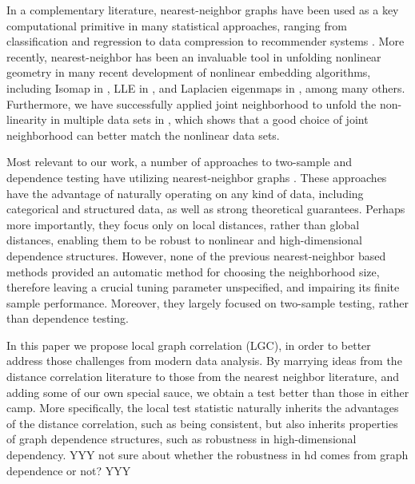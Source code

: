 \documentclass[11pt]{article}
\begin{document}
In a complementary literature, nearest-neighbor graphs have been used as a key computational primitive in many statistical approaches, ranging from classification and regression \cite{Stone1977} to data compression to recommender systems \cite{Sarwar2000}. 
More recently, nearest-neighbor has been an invaluable tool in unfolding nonlinear geometry in many recent development of nonlinear embedding algorithms, including Isomap in \cite{TenenbaumSilvaLangford2000, SilvaTenenbaum2003}, LLE in \cite{SaulRoweis2000, RoweisSaul2003}, and Laplacien eigenmaps in \cite{BelkinNiyogi2003}, among many others. Furthermore, we have successfully applied joint neighborhood to unfold the non-linearity in multiple data sets in \cite{ShenVogelsteinPriebe2015}, which shows that a good choice of joint neighborhood can better match the nonlinear data sets. 



Most relevant to our work, a number of approaches to two-sample and dependence testing have utilizing nearest-neighbor graphs \cite{David1966,Friedman1983,Schilling1986,Dumcke2014}.  These approaches have the advantage of naturally operating on any kind of data, including categorical and structured data, as well as strong theoretical guarantees.  Perhaps more importantly, they focus only on local distances, rather than global distances, enabling them to be robust to nonlinear and high-dimensional dependence structures.  However, none of the previous nearest-neighbor based methods provided an automatic method for choosing the neighborhood size, therefore leaving a crucial tuning parameter unspecified, and impairing its finite sample performance. Moreover, they largely focused on two-sample testing, rather than dependence testing.  




In this paper we propose local graph correlation (LGC), in order to better address those challenges from modern data analysis. By marrying ideas from the distance correlation literature to those from the nearest neighbor literature, and adding some of our own special sauce, we obtain a test better than those in either camp.  More specifically,  the local test statistic naturally inherits the advantages of the distance correlation, such as being consistent, but also inherits properties of graph dependence structures, such as robustness in high-dimensional dependency.  YYY not sure about whether the robustness in hd comes from graph dependence or not? YYY
\end{document}
